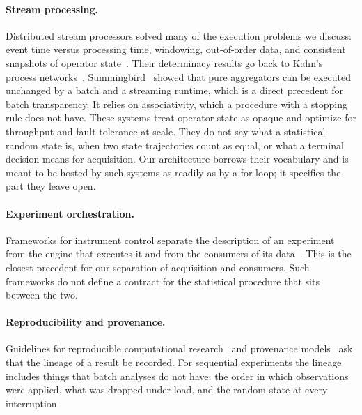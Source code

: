 \documentclass[11pt,a4paper]{article}
\theoremstyle{definition}
\theoremstyle{remark}
\begin{document}
\paragraph{Stream processing.}
Distributed stream processors solved many of the execution problems we
discuss: event time versus processing time, windowing, out-of-order
data, and consistent snapshots of operator
state~\cite{akidau2015,carbone2015,carbone2017,kreps2011,chandy1985,%
elnozahy2002}. Their determinacy results go back to Kahn's process
networks~\cite{kahn1974}. Summingbird~\cite{boykin2014} showed that pure
aggregators can be executed unchanged by a batch and a streaming runtime,
which is a direct precedent for batch transparency. It relies on
associativity, which a procedure with a stopping rule does not have.
These systems treat operator state as opaque and optimize for throughput
and fault tolerance at scale. They do not say what a statistical random
state is, when two state trajectories count as equal, or what a terminal
decision means for acquisition. Our architecture borrows their
vocabulary and is meant to be hosted by such systems as readily as by a
for-loop; it specifies the part they leave open.

\paragraph{Experiment orchestration.}
Frameworks for instrument control separate the description of an
experiment from the engine that executes it and from the consumers of
its data~\cite{allan2019}. This is the closest precedent for our
separation of acquisition and consumers. Such frameworks do not define a
contract for the statistical procedure that sits between the two.

\paragraph{Reproducibility and provenance.}
Guidelines for reproducible computational
research~\cite{sandve2013,wilkinson2016} and provenance
models~\cite{moreau2013} ask that the lineage of a result be recorded.
For sequential experiments the lineage includes things that batch
analyses do not have: the order in which observations were applied, what
was dropped under load, and the random state at every interruption.
\end{document}
